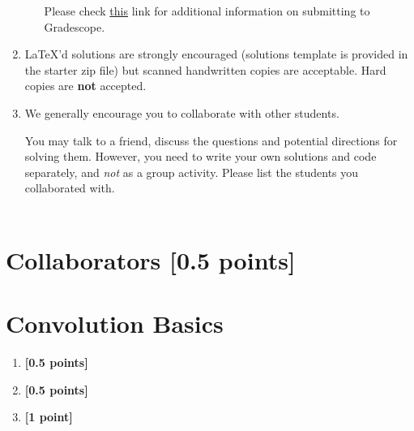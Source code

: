 \documentclass[11pt,english]{article}
\begin{document}
\begin{enumerate}
\begin{itemize}
               Please check \href{https://gradescope-static-assets.s3-us-west-2.amazonaws.com/help/submitting_hw_guide.pdf}{this} link for additional information on submitting to Gradescope.
     \end{itemize}

\item
     \LaTeX'd  solutions are strongly encouraged (solutions template is
     provided in the starter zip file)
     but scanned handwritten copies are acceptable.
     Hard copies are \textbf{not} accepted.


\item We generally encourage you to collaborate with other students.

You may talk to a friend,
discuss the questions and potential directions for solving them. However, you need to write
your own solutions and code separately, and \emph{not} as a group activity.
Please list the students you collaborated with. \\ \\
\end{enumerate}



\section{Collaborators [0.5 points]}



\section{Convolution Basics}
\begin{enumerate}[start]

\item
\textbf{[0.5 points]}


\item 
\textbf{[0.5 points]}


\item 
\textbf{[1 point]}


\end{enumerate}
\end{document}
